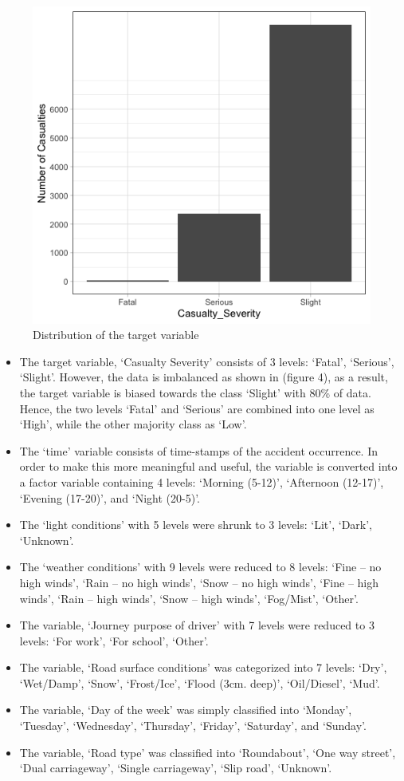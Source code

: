 \documentclass[
  a4paper,
]{article}
\begin{document}
\begin{figure}[h!]

{\centering \includegraphics[width=0.75\linewidth]{cas} 

}

\caption{Distribution of the target variable}\label{fig:unnamed-chunk-5}
\end{figure}

\begin{itemize}
\item
  The target variable, `Casualty Severity' consists of 3 levels:
  `Fatal', `Serious', `Slight'. However, the data is imbalanced as shown
  in (figure 4), as a result, the target variable is biased towards the
  class `Slight' with 80\% of data. Hence, the two levels `Fatal' and
  `Serious' are combined into one level as `High', while the other
  majority class as `Low'.
\item
  The `time' variable consists of time-stamps of the accident
  occurrence. In order to make this more meaningful and useful, the
  variable is converted into a factor variable containing 4 levels:
  `Morning (5-12)', `Afternoon (12-17)', `Evening (17-20)', and `Night
  (20-5)'.
\item
  The `light conditions' with 5 levels were shrunk to 3 levels: `Lit',
  `Dark', `Unknown'.
\item
  The `weather conditions' with 9 levels were reduced to 8 levels: `Fine
  -- no high winds', `Rain -- no high winds', `Snow -- no high winds',
  `Fine -- high winds', `Rain -- high winds', `Snow -- high winds',
  `Fog/Mist', `Other'.
\item
  The variable, `Journey purpose of driver' with 7 levels were reduced
  to 3 levels: `For work', `For school', `Other'.
\item
  The variable, `Road surface conditions' was categorized into 7 levels:
  `Dry', `Wet/Damp', `Snow', `Frost/Ice', `Flood (3cm. deep)',
  `Oil/Diesel', `Mud'.
\item
  The variable, `Day of the week' was simply classified into `Monday',
  `Tuesday', `Wednesday', `Thursday', `Friday', `Saturday', and
  `Sunday'.
\item
  The variable, `Road type' was classified into `Roundabout', `One way
  street', `Dual carriageway', `Single carriageway', `Slip road',
  `Unknown'.
\end{itemize}
\end{document}
